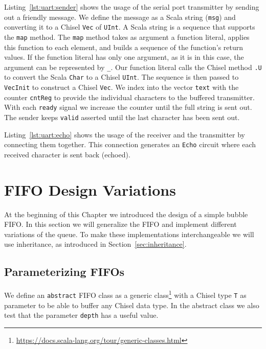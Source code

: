 \documentclass[%
    10pt,
    headinclude, footexclude,
    openright, %
    notitlepage,
    cleardoubleempty,
    headsepline,
    pointlessnumbers,
    bibtotoc, idxtotoc,
    ]{scrbook}
\newcommand{\code}[1]{{\small{\texttt{#1}}}}
\newcommand{\myref}[2]{\href{#1}{#2}}
\renewcommand{\myref}[2]{{#2}{\footnote{\url{#1}}}}
\begin{document}

Listing~\ref{lst:uart:sender} shows the usage of the serial port transmitter
by sending out a friendly message. We define the message as a Scala
string (\code{msg}) and converting it to a Chisel \code{Vec} of \code{UInt}.
A Scala string is a sequence that supports the \code{map} method.
The \code{map} method takes as argument a function literal, applies this function to
each element, and builds a sequence of the function's return values.
If the function literal has only one argument, as it is in this case, the
argument can be represented by \code{\_}. Our function literal calls
the Chisel method \code{.U} to convert the Scala \code{Char} to a Chisel
\code{UInt}. The sequence is then passed to \code{VecInit} to construct
a Chisel \code{Vec}. We index into the vector \code{text} with the counter
\code{cntReg} to provide the individual characters to the buffered transmitter.
With each \code{ready} signal we increase the counter until the full string
is sent out. The sender keeps \code{valid} asserted until the last character
has been sent out.


Listing~\ref{lst:uart:echo} shows the usage of the receiver and the transmitter
by connecting them together. This connection generates an \code{Echo} circuit where each
received character is sent back (echoed).

\section{FIFO Design Variations}
\label{sec:more:fifo}

At the beginning of this Chapter we introduced the design of a simple bubble FIFO.
In this section we will generalize the FIFO and implement different variations of the queue.
To make these implementations interchangeable we will use inheritance,
as introduced in Section~\ref{sec:inheritance}.

\subsection{Parameterizing FIFOs}

We define an \code{abstract}
FIFO class as a \myref{https://docs.scala-lang.org/tour/generic-classes.html}{generic class}
with a Chisel type \code{T} as parameter to be able to buffer
any Chisel data type. In the abstract class we also test that the
parameter \code{depth} has a useful value.
\end{document}
